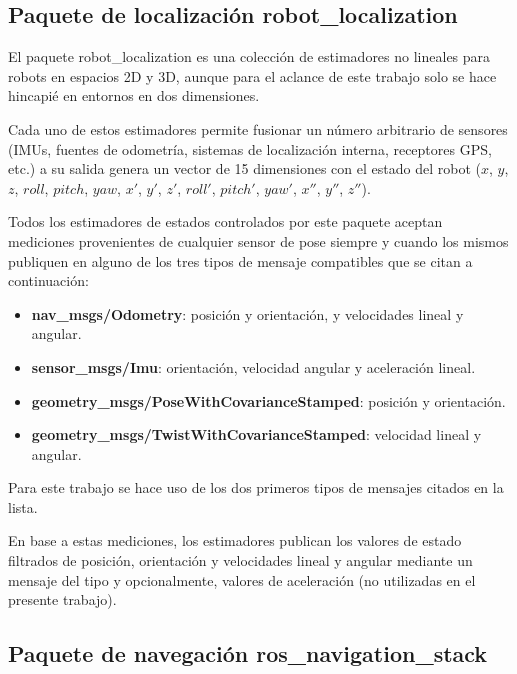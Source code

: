 
\subsection{Paquete de localización robot\_localization}

El paquete robot\_localization es una colección de estimadores no lineales para robots en espacios 2D y 3D, aunque para el aclance de este trabajo solo se hace hincapié en entornos en dos dimensiones.

Cada uno de estos estimadores permite fusionar un número arbitrario de sensores (IMUs, fuentes de odometría, sistemas de localización interna, receptores GPS, etc.) a su salida genera un vector de 15 dimensiones con el estado del robot ($x$, $y$, $z$, $roll$, $pitch$, $yaw$, $x'$, $y'$, $z'$, $roll'$, $pitch'$, $yaw'$, $x''$, $y''$, $z''$).

Todos los estimadores de estados controlados por este paquete aceptan mediciones provenientes de cualquier sensor de pose siempre y cuando los mismos publiquen en alguno de los tres tipos de mensaje compatibles que se citan a continuación:

\begin{itemize}
    \item \textbf{nav\_msgs/Odometry}: posición y orientación, y velocidades lineal y angular.
    \item \textbf{sensor\_msgs/Imu}: orientación, velocidad angular y aceleración lineal.
    \item \textbf{geometry\_msgs/PoseWithCovarianceStamped}: posición y orientación.
    \item \textbf{geometry\_msgs/TwistWithCovarianceStamped}: velocidad lineal y angular.
\end{itemize}

Para este trabajo se hace uso de los dos primeros tipos de mensajes citados en la lista.

En base a estas mediciones, los estimadores publican los valores de estado filtrados de posición, orientación y velocidades lineal y angular mediante un mensaje del tipo  y opcionalmente, valores de aceleración (no utilizadas en el presente trabajo).


\subsection{Paquete de navegación ros\_navigation\_stack}

